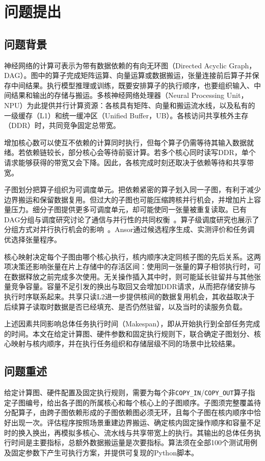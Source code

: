 \section{问题提出}
\subsection{问题背景}

神经网络的计算可表示为带有数据依赖的有向无环图（Directed Acyclic Graph，DAG）。图中的算子完成矩阵运算、向量运算或数据搬运，张量连接前后算子并保存中间结果。执行模型推理或训练，既要安排算子的执行顺序，也要组织输入、中间结果和输出的存储与搬运。多核神经网络处理器（Neural Processing Unit，NPU）为此提供并行计算资源：各核具有矩阵、向量和搬运流水线，以及私有的一级缓存（L1）和统一缓冲区（Unified Buffer，UB）。各核访问共享核外主存（DDR）时，共同竞争固定总带宽。

增加核心数可以使互不依赖的计算同时执行，但每个算子仍需等待其输入数据就绪。若依赖链较长，部分核心会等待前驱计算。若多个核心同时读写DDR，单个请求能够获得的带宽又会下降。因此，各核完成时刻还取决于依赖等待和共享带宽。

子图划分把算子组织为可调度单元。把依赖紧密的算子划入同一子图，有利于减少边界搬运和保留数据复用。但过大的子图也可能压缩跨核并行机会，并增加片上容量压力。细分子图提供更多可调度单元，却可能使同一张量被重复读取。已有DAG分组与调度研究讨论了通信与并行性的共同权衡~\cite{A49}。算子级调度研究也展示了分组方式对并行执行机会的影响~\cite{A08}。Ansor通过候选程序生成、实测评价和任务调优选择张量程序\cite{A12}。

核心映射决定每个子图由哪个核心执行，核内顺序决定同核子图的先后关系。这两项决策还影响张量在片上存储中的存活区间：使用同一张量的算子相邻执行时，可在数据释放之前完成多次使用。无关操作插入其中时，则可能延长驻留并与其他张量竞争容量。容量不足引发的换出与取回又会增加DDR请求，从而把存储安排与执行时序联系起来。共享只读L2进一步提供核间的数据复用机会，其收益取决于后续算子读取时数据是否已经填充、是否仍然驻留，以及当时的读服务负载。

上述因素共同影响总体任务执行时间（Makespan），即从开始执行到全部任务完成的时间。本文在给定计算图、硬件参数和固定执行规则下，联合确定子图划分、核心映射与核内顺序，并在执行任务组织和存储层级不同的场景中比较结果。

\subsection{问题重述}

给定计算图、硬件配置及固定执行规则，需要为每个非\texttt{COPY\_IN}\slash\allowbreak\texttt{COPY\_OUT}算子指定子图编号，给出各子图的所属核心和每个核心上的子图顺序。子图须完整覆盖待分配算子，由跨子图依赖形成的子图依赖图必须无环，且每个子图在核内顺序中恰好出现一次。评估程序按照场景重建边界搬运、确定核内固定操作顺序和容量不足时的换入换出，再模拟多核心、流水线与共享带宽上的执行。其输出的总体任务执行时间是主要指标，总额外数据搬运量是次要指标。算法须在全部100个测试用例及固定参数下产生可执行方案，并提供可复现的Python脚本。

